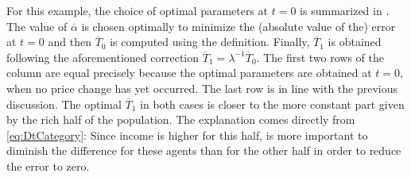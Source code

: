 \documentclass[english, a4paper, 12pt]{article}
\begin{document}
For this example, the choice of optimal parameters at $t = 0$ is summarized in . The value of $\overline{\alpha}$ is chosen optimally to minimize the (absolute value of the) error at $t = 0$ and then $\overline{T}_{0}$ is computed using the definition. Finally, $\overline{T}_{1}$ is obtained following the aforementioned correction $\overline{T}_{1} = \lambda^{-1}\overline{T}_{0}$. The first two rows of the column are equal precisely because the optimal parameters are obtained at $t =0$, when no price change has yet occurred. The last row is in line with the previous discussion. The optimal $\overline{T}_{1}$ in both cases is closer to the more constant part given by the rich half of the population. The explanation comes directly from \eqref{eq:DtCategory}: Since income is higher for this half, is more important to diminish the difference for these agents than for the other half in order to reduce the error to zero.
\end{document}

